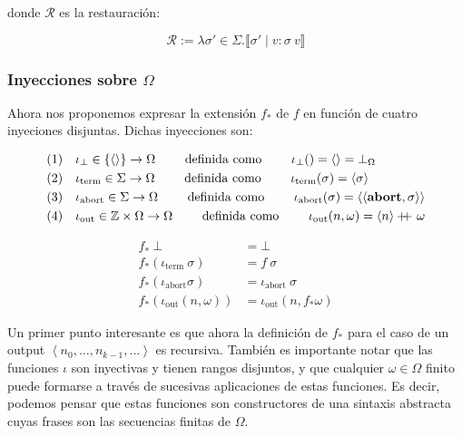 \documentclass[a4paper, 12pt]{article}
\newcommand\doubleplus{+\kern-1.3ex+\kern0.8ex}
\begin{document}
donde $\mathcal{R}$ es la restauración:

\begin{equation*}
  \mathcal{R} := \lambda \sigma' \in \Sigma . \llbracket \sigma' \mid v : \sigma
  ~ v\rrbracket
\end{equation*}

\subsubsection{Inyecciones sobre $\Omega$}

Ahora nos proponemos expresar la extensión $f_*$ de $f$ en función de cuatro
inyeciones disjuntas. Dichas inyecciones son:

\begin{align*}
  &(1) ~ ~ ~ \iota_\bot \in \left\{ \left< \right> \right\} \to \Omega \qquad \text{ definida como
  } \qquad \iota_\bot () = \left< \right> = \bot_\Omega\\
  &(2) ~ ~  ~\iota_{\text{term}} \in \Sigma \to \Omega \qquad \text{ definida como
  } \qquad \iota_{\text{term}}(\sigma) = \left<\sigma \right>\\
  &(3) ~ ~ ~ \iota_{\text{abort}} \in \Sigma \to \Omega \qquad \text{ definida como
  } \qquad \iota_{\text{abort}} (\sigma) = \left<\left<\textbf{abort}, \sigma \right> \right>\\
  &(4)~ ~ ~ \iota_{\text{out}} \in \mathbb{Z} \times \Omega \to \Omega \qquad \text{ definida como
  } \qquad \iota_{\text{out}}(n, \omega) = \left<n \right> \doubleplus \omega
\end{align*}

\begin{align*}
  f_* ~ \bot &= \bot  \\ 
  f_*(\iota_\text{term} ~ \sigma) &= f ~ \sigma \\ 
  f_*(\iota_{\text{abort}} \sigma) &= \iota_{\text{abort}} ~ \sigma \\ 
  f_*(\iota_{\text{out}}(n, \omega)) &= \iota_{\text{out}}(n, f_* \omega)
\end{align*}

Un primer punto interesante es que ahora la definición de $f_*$ para el caso de un
output $\left<n_0, \ldots, n_{k-1}, \ldots\right>$ es recursiva. También es
importante notar que las funciones $\iota$ son inyectivas y tienen rangos
disjuntos, y que cualquier $\omega \in \Omega$ finito puede formarse a través de
sucesivas aplicaciones de estas funciones. Es decir, podemos pensar que estas
funciones son constructores de una sintaxis abstracta cuyas frases son las
secuencias finitas de $\Omega$.
\end{document}
